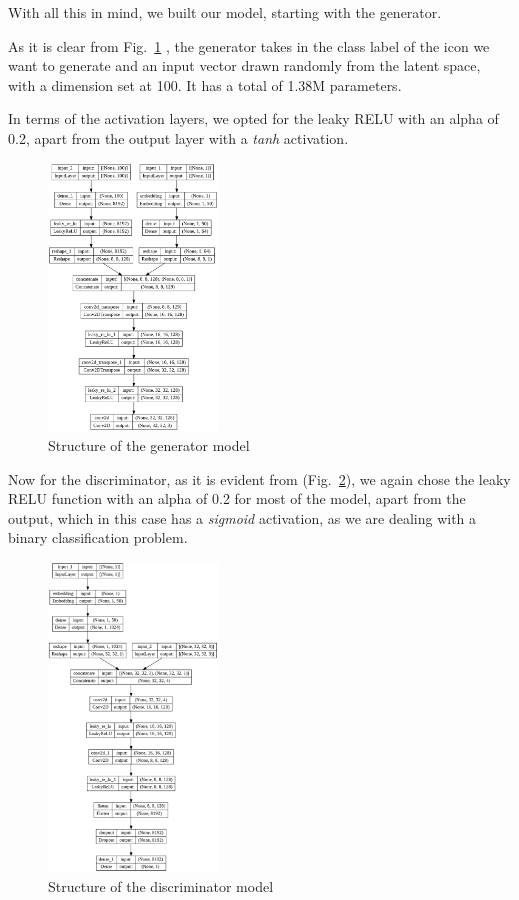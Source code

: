 With all this in mind, we built our model, starting with the generator.

As it is clear from Fig.~\ref{fig:GenStruct} , the generator takes in the class label of the icon we want to generate and an input vector drawn randomly from the latent space, with a dimension set at 100.
It has a total of 1.38M parameters.

In terms of the activation layers, we opted for the leaky RELU with an alpha of 0.2, apart from the output layer with a \textit{tanh} activation.

\begin{figure}[htbp]
    \centering
    \includegraphics[width=0.4\textwidth]{images/summary/generator}
    \caption{Structure of the generator model}
    \label{fig:GenStruct}
\end{figure}

Now for the discriminator, as it is evident from (Fig.~\ref{fig:DiscStruct}), we again chose the leaky RELU function with an alpha of 0.2 for most of the model, apart from the output, which in this case has a \textit{sigmoid} activation, as we are dealing with a binary classification problem.

\begin{figure}[htbp]
    \centering
    \includegraphics[width=0.4\textwidth]{images/summary/discriminator}
    \caption{Structure of the discriminator model}
    \label{fig:DiscStruct}
\end{figure}

